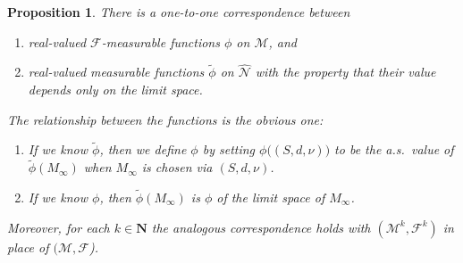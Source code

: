 \documentclass[JEP,XML,SOM,Unicode]{cedram}
\let\mathcal\mathscr
\theoremstyle{plain}
\numberwithin{theorem}{section}
\newtheorem{proposition}[theorem]{Proposition}
\theoremstyle{definition}
\newcommand\mmspace{{\mathcal M}}
\newcommand\mmsigma{{\mathcal F}}
\newcommand{\matrixmspace}{\mathcal N}
\newcommand{\N}{\mathbf{N}}
\let\wt\widetilde
\begin{document}
\begin{proposition}
\label{prop::measurability_correspondence}
There is a one-to-one correspondence between
\begin{enumerate}
\item real-valued $\mmsigma$-measurable functions $\phi$ on $\mmspace$, and
\item real-valued measurable functions $\wt \phi$ on $\widehat {\matrixmspace}$ with the property that their value depends only on the limit space.
\end{enumerate}
The relationship between the functions is the obvious one:
\begin{enumerate}
\item If we know $\wt \phi$, then we define $\phi$ by setting $\phi\bigl( (S,d,\nu) \bigr)$ to be the a.s.\ value of $\wt \phi (M_\infty)$ when $M_\infty$ is chosen via $(S,d,\nu)$.
\item If we know $\phi$, then $\wt \phi(M_\infty)$ is $\phi$ of the limit space of $M_\infty$.
\end{enumerate}
Moreover, for each $k \in \N$ the analogous correspondence holds with $(\mmspace^k,\mmsigma^k)$ in place of $(\mmspace,\mmsigma$).
\end{proposition}
\end{document}
